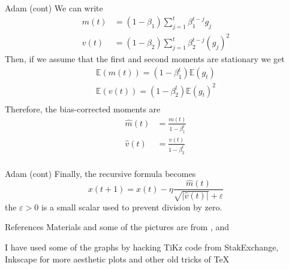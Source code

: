 \documentclass{beamer}
\begin{document}
\begin{frame}{Adam (cont)}
	We can write
	\begin{equation*}
	\begin{split}
		m(t)&= (1-\beta_1) \sum_{j=1}^t \beta_1^{t-j} g_j \\
		v(t)&=(1-\beta_2) \sum_{j=1}^t \beta_2^{t-j} (g_j)^2 
	\end{split}
\end{equation*} 		
Then, if we assume that the first and second moments are stationary  we get 
\begin{equation*}
	\begin{split}
	\mathbb{E}(m(t))=(1-\beta_1^t) \mathbb{E}(g_t) \\
		\mathbb{E}(v(t))=(1-\beta_2^t) \mathbb{E}(g_t)^2 \\
	\end{split}
\end{equation*}
Therefore, the bias-corrected moments are
\begin{equation*}
	\begin{split}
			\widehat{m}(t)&= \frac{m(t)}{1-\beta_1^t} \\
			\widehat{v}(t)&=\frac{v(t)}{1-\beta_2^t} \\
	\end{split}
\end{equation*}

\end{frame}
\begin{frame}{Adam (cont)}
	Finally, the recursive formula becomes
	\begin{equation*}
		x(t+1)= x(t)- \eta \frac{\widehat{m}(t)}{\sqrt{|\widehat{v}(t)|}+\varepsilon}
	\end{equation*}
	the $\varepsilon>0$ is a small scalar used to prevent division by zero. 
\end{frame}


\begin{frame}{References}
	Materials and some of the pictures are from \citep{calin}, and \citep{murphyintro}
	\printbibliography 	
	
	I have used some of the graphs by hacking TiKz code from StakExchange, Inkscape for more aesthetic plots and other old tricks of \TeX
	
\end{frame}
\end{document}
